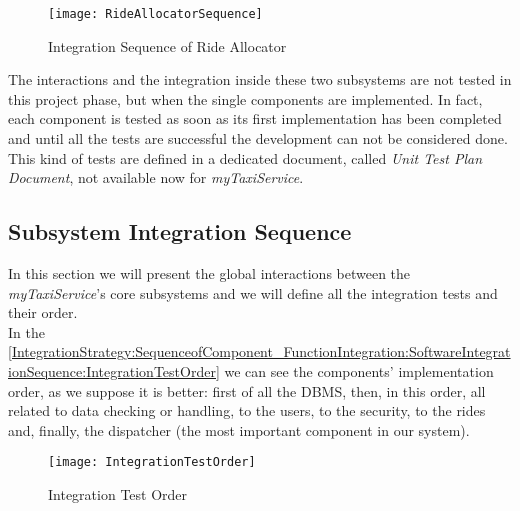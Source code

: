 \documentclass[\mainpath/main]{subfiles}
\begin{document}
\begin{figure}[h]
	\centering
	\texttt{[image: RideAllocatorSequence]}
	\caption{Integration Sequence of Ride Allocator}
	\label{IntegrationStrategy:SequenceofComponent_FunctionIntegration:SoftwareIntegrationSequence:RideAllocatorSequence}
\end{figure}

The interactions and the integration inside these two subsystems are not tested in this project phase, but when the single components are implemented. In fact, each component is tested as soon as its first implementation has been completed and until all the tests are successful the development can not be considered done.\\
This kind of tests are defined in a dedicated document, called \textit{Unit Test Plan Document}, not available now for \textit{myTaxiService}.

\subsection{Subsystem Integration Sequence}
\label{IntegrationStrategy:SequenceofComponent_FunctionIntegration:SubsystemIntegrationSequence}
In this section we will present the global interactions between the \textit{myTaxiService}'s core subsystems and we will define all the integration tests and their order.\\
In the \autoref{IntegrationStrategy:SequenceofComponent_FunctionIntegration:SoftwareIntegrationSequence:IntegrationTestOrder} we can see the components' implementation order, as we suppose it is better: first of all the DBMS, then, in this order, all related to data checking or handling, to the users, to the security, to the rides and, finally, the dispatcher (the most important component in our system).

\begin{figure}[h]
	\centering
	\texttt{[image: IntegrationTestOrder]}
	\caption{Integration Test Order}
	\label{IntegrationStrategy:SequenceofComponent_FunctionIntegration:SoftwareIntegrationSequence:IntegrationTestOrder}
\end{figure}

\clearpage
\end{document}
